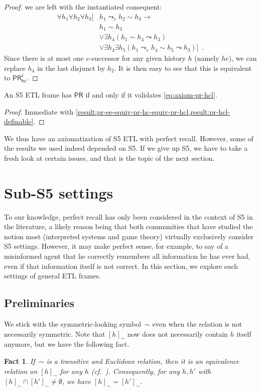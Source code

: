 \documentclass{article}
\newcommand{\PR}{\ensuremath{\mathsf{PR}}\xspace}
\newcommand{\PRhcl}{\ensuremath{\mathsf{PR_{hc}^\ell}}\xspace}
\newcommand{\acc}{\sim}
\renewcommand{\implies}{\rightarrow}
\newcommand{\tiff}{if and only if\xspace}
\newcommand{\mpunct}{\enspace}
\newcounter{#1}
\newtheorem{fact}{Fact}[section]
\newtheorem{fact}{Fact}
\begin{document}
\begin{proof}
  we are left with the instantiated consequent:
  \begin{align*}
    \forall h_1\forall h_2\forall h_3\big[
    &h_1\leadsto_e h_2\acc h_3\implies\\
    &h_1\acc h_3\\
    &\vee\exists h_4(h_1\acc h_4\leadsto h_3)\\
    &\vee\exists h_4\exists h_5(h_1\leadsto_e h_4\acc h_5\leadsto h_3)\big]\mpunct.
  \end{align*}
  Since there is at most one $e$-successor for any given history $h$ (namely $he$),
  we can replace $h_4$ in the last disjunct by $h_2$.
  It is then easy to see that this is equivalent to \PRhcl.
\end{proof}

\begin{corollary}
  \label{result:pr-definable}
  An S5 ETL frame has \PR \tiff it validates \eqref{eq:axiom-pr-hcl}.
\end{corollary}
\begin{proof}
  Immediate with \cref{result:pr-ee-equiv-pr-hc-equiv-pr-hcl,result:pr-hcl-definable}.
\end{proof}

We thus have an axiomatization of S5 ETL with perfect recall.
However, some of the results we used indeed depended on S5.
If we give up S5, we have to take a fresh look at certain issues,
and that is the topic of the next section.

\section{Sub-S5 settings}
\label{sec:sub-s5-settings}

To our knowledge, perfect recall has only been considered in the context of S5 in the literature,
a likely reason being that both communities that have studied the notion most
(interpreted systems and game theory)
virtually exclusively consider S5 settings.
However, it may make perfect sense, for example,
to say of a misinformed agent that he correctly remembers all information he has ever had,
even if that information itself is not correct.
In this section, we explore such settings of general ETL frames.

\subsection{Preliminaries}
\label{sec:preliminaries}

We stick with the symmetric-looking symbol~$\acc$ even when the relation is not necessarily symmetric.
Note that $[h]_\acc$ now does not necessarily contain $h$ itself anymore,
but we have the following fact.
\begin{fact}
  \label{result:trans-eucl-eq-class}
  If~$\acc$ is a transitive and Euclidean relation,
  then it is an equivalence relation on $[h]_\acc$ for any $h$
  (cf.~\cite[Theorem~3.3]{halpern_relationship_1991}).
  Consequently, for any $h,h'$ with $[h]_\acc\cap[h']_\acc\neq\emptyset$,
  we have $[h]_\acc=[h']_\acc$.
\end{fact}
\end{document}
